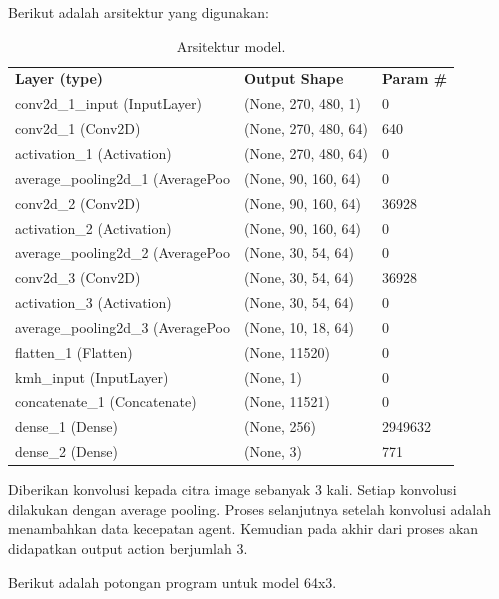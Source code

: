 Berikut adalah arsitektur yang digunakan:

\begin{table}[H]
	\begin{tabular}{lll}
		\textbf{Layer (type)}                      & \textbf{Output Shape}         & \textbf{Param \#} \\
		conv2d\_1\_input (InputLayer)     & (None, 270, 480, 1)  & 0        \\
		conv2d\_1 (Conv2D)                & (None, 270, 480, 64) & 640      \\
		activation\_1 (Activation)        & (None, 270, 480, 64) & 0        \\
		average\_pooling2d\_1 (AveragePoo & (None, 90, 160, 64)  & 0        \\
		conv2d\_2 (Conv2D)                & (None, 90, 160, 64)  & 36928    \\
		activation\_2 (Activation)        & (None, 90, 160, 64)  & 0        \\
		average\_pooling2d\_2 (AveragePoo & (None, 30, 54, 64)   & 0        \\
		conv2d\_3 (Conv2D)                & (None, 30, 54, 64)   & 36928    \\
		activation\_3 (Activation)        & (None, 30, 54, 64)   & 0        \\
		average\_pooling2d\_3 (AveragePoo & (None, 10, 18, 64)   & 0        \\
		flatten\_1 (Flatten)              & (None, 11520)        & 0        \\
		kmh\_input (InputLayer)           & (None, 1)            & 0        \\
		concatenate\_1 (Concatenate)      & (None, 11521)        & 0        \\
		dense\_1 (Dense)                  & (None, 256)          & 2949632  \\
		dense\_2 (Dense)                  & (None, 3)            & 771     
	\end{tabular}
\caption{Arsitektur model.}
\label{tb:arsitektur_model}
\end{table}

Diberikan konvolusi kepada citra image sebanyak 3 kali. Setiap konvolusi dilakukan dengan average pooling. Proses selanjutnya setelah konvolusi adalah menambahkan data kecepatan agent. Kemudian pada akhir dari proses akan didapatkan output action berjumlah 3.

Berikut adalah potongan program untuk model 64x3.


